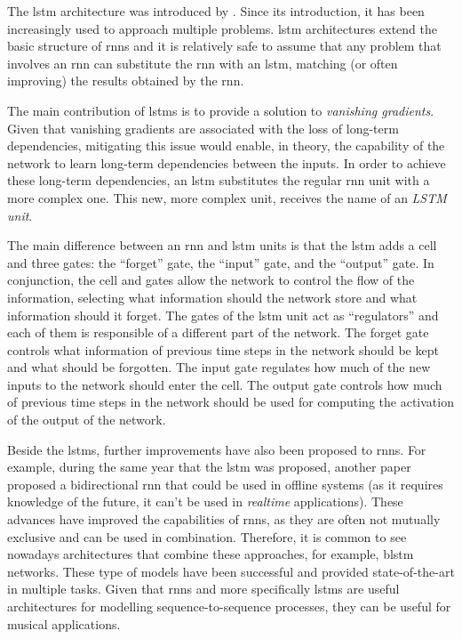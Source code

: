 

The \gls{lstm} architecture was introduced by
\textcite{hochreiter1997long}. Since its introduction, it
has been increasingly used to approach multiple problems.
\gls{lstm} architectures extend the basic structure of
\glspl{rnn} and it is relatively safe to assume that any
problem that involves an \gls{rnn} can substitute the
\gls{rnn} with an \gls{lstm}, matching (or often improving)
the results obtained by the \gls{rnn}.

The main contribution of \glspl{lstm} is to provide a
solution to \emph{vanishing gradients}. Given that vanishing
gradients are associated with the loss of long-term
dependencies, mitigating this issue would enable, in theory,
the capability of the network to learn long-term
dependencies between the inputs. In order to achieve these
long-term dependencies, an \gls{lstm} substitutes the
regular \gls{rnn} unit with a more complex one. This new,
more complex unit, receives the name of an \emph{LSTM unit}.

The main difference between an \gls{rnn} and \gls{lstm}
units is that the \gls{lstm} adds a cell and three gates:
the ``forget'' gate, the ``input'' gate, and the ``output''
gate. In conjunction, the cell and gates allow the network
to control the flow of the information, selecting what
information should the network store and what information
should it forget. The gates of the \gls{lstm} unit act as
``regulators'' and each of them is responsible of a
different part of the network. The forget gate controls what
information of previous time steps in the network should be
kept and what should be forgotten. The input gate regulates
how much of the new inputs to the network should enter the
cell. The output gate controls how much of previous time
steps in the network should be used for computing the
activation of the output of the network.

Beside the \glspl{lstm}, further improvements have also been
proposed to \glspl{rnn}. For example, during the same year
that the \gls{lstm} was proposed, another paper proposed a
bidirectional \gls{rnn} that could be used in offline
systems (as it requires knowledge of the future, it can’t be
used in \emph{realtime} applications). These advances have
improved the capabilities of \glspl{rnn}, as they are often
not mutually exclusive and can be used in combination.
Therefore, it is common to see nowadays architectures that
combine these approaches, for example, \gls{blstm} networks.
These type of models have been successful and provided
state-of-the-art in multiple tasks. Given that \glspl{rnn}
and more specifically \glspl{lstm} are useful architectures
for modelling sequence-to-sequence processes, they can be
useful for musical applications.
